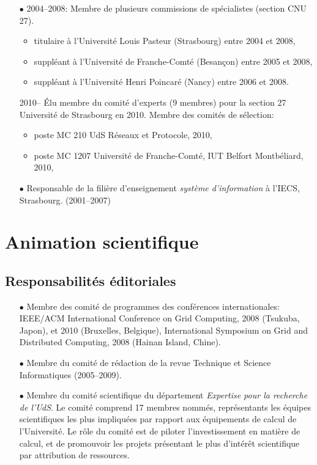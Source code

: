 \begin{itemize}
\item[$\bullet$] 
2004--2008: Membre de plusieurs commissions de spécialistes (section CNU 27).
\begin{itemize}
\item titulaire à l'Université Louis Pasteur (Strasbourg) entre 2004 et 2008,
\item suppléant à l'Université de Franche-Comté (Besançon) entre 2005 et 2008,
\item suppléant à l'Université Henri Poincaré (Nancy) entre 2006 et 2008.\\
\end{itemize}
2010-- \'Elu membre du comité d'experts (9 membres) pour la section 27 Université de Strasbourg en 2010.
Membre des comités de sélection:
\begin{itemize}
\item poste MC 210 UdS Réseaux et Protocole, 2010,
\item poste MC 1207 Université de Franche-Comté, IUT Belfort Montbéliard, 2010,
\end{itemize}



\item[$\bullet$] Responsable de la filière d'enseignement \emph{système d'information} à l'IECS, Strasbourg. (2001--2007)
\end{itemize}
\vspace{1cm}




\section{Animation scientifique}

\subsection{Responsabilités éditoriales}
\begin{itemize}
\item[$\bullet$] 
Membre des comité de programmes des conférences internationales:
IEEE/ACM International Conference on Grid Computing, 2008 (Tsukuba, Japon), et 2010 (Bruxelles, Belgique),
International Symposium on Grid and Distributed Computing, 2008 (Hainan Island, Chine). 
\item [$\bullet$]
Membre du comité de rédaction de la revue Technique et Science Informatiques (2005--2009).
\item [$\bullet$]
Membre du comité scientifique du département \emph{Expertise pour la recherche de l'UdS}. 
Le comité comprend 17 membres nommés, représentants les équipes scientifiques les plus impliquées 
par rapport aux équipements de calcul de l'Université. Le rôle du comité est de piloter
l'investissement en matière de calcul, et de promouvoir les projets présentant le plus 
d'intérêt scientifique par attribution de ressources.
\end{itemize}


